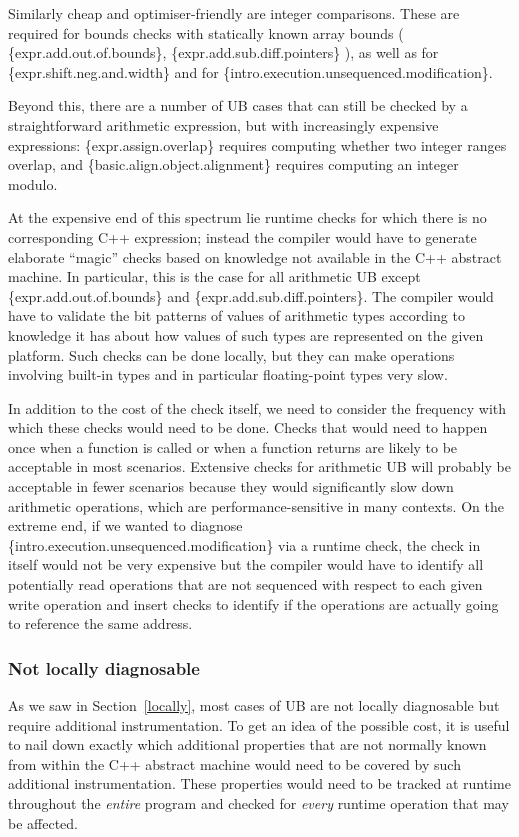Similarly cheap and optimiser-friendly are integer comparisons. These are  required for bounds checks with statically known array bounds
(
\{expr.add.out.of.bounds\},
\{expr.add.sub.diff.pointers\}
), as well as for \{expr.shift.neg.and.width\} and for \{intro.execution.unsequenced.modification\}.

Beyond this, there are a number of UB cases that can still be checked by a straightforward arithmetic expression, but with increasingly expensive expressions: \{expr.assign.overlap\} requires computing whether two integer ranges overlap, and  \{basic.align.object.alignment\} requires computing an integer modulo. 

At the expensive end of this spectrum lie runtime checks for which there is no corresponding C++ expression; instead the compiler would have to generate elaborate ``magic'' checks based on knowledge not available in the C++ abstract machine. In particular, this is the case for all arithmetic UB except \{expr.add.out.of.bounds\} and
\{expr.add.sub.diff.pointers\}. The compiler would have to validate the bit patterns of values of arithmetic types according to knowledge it has about how values of such types are represented on the given platform. Such checks can be done locally, but they can make operations involving built-in types and in particular floating-point types very slow.

In addition to the cost of the check itself, we need to consider the frequency with which these checks would need to be done. Checks that would need to happen once when a function is called or when a function returns are likely to be acceptable in most scenarios. Extensive checks for arithmetic UB will probably be acceptable in fewer scenarios because they would significantly slow down arithmetic operations, which are performance-sensitive in many contexts. On the extreme end, if we wanted to diagnose \{intro.execution.unsequenced.modification\} via a runtime check, the check in itself would not be very expensive but the compiler would have to identify all potentially read operations that are not sequenced with respect to each given write operation and insert checks to identify if the operations are actually going to reference the same address.
\subsubsection{Not locally diagnosable}

As we saw in Section~\ref{locally}, most cases of UB are not locally diagnosable but require additional instrumentation. To get an idea of the possible cost, it is useful to nail down exactly which additional properties that are not normally known from within the C++ abstract machine would need to be covered by such additional instrumentation. These properties would need to be tracked  at runtime throughout the \emph{entire} program and checked for \emph{every} runtime operation that may be affected.

